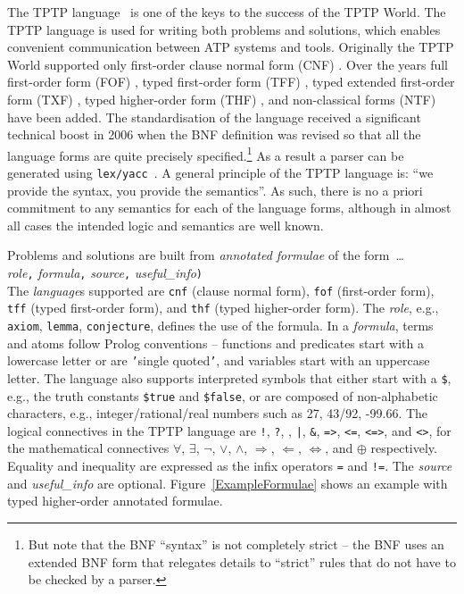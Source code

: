\documentclass{easychair}
\newcommand{\smalltt}[1]{\small \texttt{#1}}
\begin{document}
The TPTP language~\cite{Sut23-IGPL} is one of the keys to the success of the TPTP World.
The TPTP language is used for writing both problems and solutions,
which enables convenient communication between ATP systems and tools.
Originally the TPTP World supported only first-order clause normal form (CNF)
\cite{SS98-JAR}.
Over the years full first-order form (FOF)
\cite{Sut09}, 
typed first-order form (TFF)
\cite{SS+12,BP13-TFF1}, 
typed extended first-order form (TXF)
\cite{SK18}, 
typed higher-order form (THF)
\cite{SB10,KSR16}, 
and non-classical forms (NTF)~\cite{SF+22} have been added.
The standardisation of the language received a significant technical boost in 2006 when the BNF
definition was revised so that all the language forms are quite precisely specified.\footnote{%
But note that the BNF ``syntax'' is not completely strict -- the BNF uses an extended BNF form
that relegates details to ``strict'' rules that do not have to be checked by a parser.}
As a result a parser can be generated using {\tt lex/yacc}~\cite{VS06}.
A general principle of the TPTP language is: ``we provide the syntax, you provide the semantics''.
As such, there is no a priori commitment to any semantics for each of the language forms, 
although in almost all cases the intended logic and semantics are well known.

Problems and solutions are built from {\em annotated formulae} of the form~\ldots \\
{\em role}{\tt ,}
{\em formula}{\tt ,}
{\em source}{\tt ,}
{\em useful\_info}{\tt )}\\
The {\em language}s supported are {\smalltt{cnf}} (clause normal form), {\smalltt{fof}}
(first-order form), {\smalltt{tff}} (typed first-order form), and {\smalltt{thf}}
(typed higher-order form).
The {\em role}, e.g., {\smalltt{axiom}}, {\smalltt{lemma}}, {\smalltt{conjecture}}, defines the 
use of the formula.
In a {\em formula}, terms and atoms follow Prolog conventions -- functions and predicates start 
with a lowercase letter or are {\tt '}single quoted{\tt '}, and variables start with an uppercase 
letter.
The language also supports interpreted symbols that either start with a {\tt \$}, e.g., the 
truth constants {\smalltt{\$true}} and {\smalltt{\$false}}, or are composed of 
non-alphabetic characters, e.g., integer/rational/real numbers such as 27, 43/92, -99.66.
The logical connectives in the TPTP language are
{\tt !}, {\tt ?}, {\tt {\raisebox{0.4ex}{\texttildelow}}}, {\tt |}, {\tt \&}, {\tt =>}, {\tt <=},
{\tt <=>}, and {\tt <{\raisebox{0.4ex}{\texttildelow}}>},
for the mathematical connectives
$\forall$, $\exists$, $\neg$, $\vee$, $\wedge$, $\Rightarrow$, $\Leftarrow$, $\Leftrightarrow$, 
and $\oplus$ respectively.
Equality and inequality are expressed as the infix operators {\tt =} and {\tt !=}.
The {\em source} and {\em useful\_info} are optional.
Figure~\ref{ExampleFormulae} shows an example with typed higher-order annotated formulae.
\end{document}
